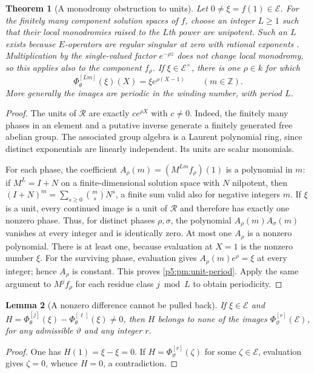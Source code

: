 \documentclass[11pt,a4paper]{article}
\newtheorem{theorem}{Theorem}[section]
\newtheorem{lemma}[theorem]{Lemma}
\theoremstyle{definition}
\theoremstyle{remark}
\numberwithin{equation}{section}
\begin{document}
\begin{theorem}[A monodromy obstruction to units]
\label{p5:pm:units}
Let $0\ne\xi=f(1)\in\mathcal E$.  For the finitely many component
solution spaces of $f$, choose an integer $L\ge1$ such that their
local monodromies raised to the $L$th power are unipotent.  Such an
$L$ exists because $E$-operators are regular singular at zero with
rational exponents
\cite[\S1, equation~(1.1)]{p5:FischlerRivoal2016Eoperators}.
Multiplication by the single-valued factor $e^{-\rho z}$ does not
change local monodromy, so this applies also to the component $f_\rho$.
If $\xi\in\mathcal E^\times$, there is one $\rho\in k$ for which
\begin{equation}\label{p5:pm:unit-period}
 \Phi_\theta^{[Lm]}(\xi)(X)=\xi e^{\rho(X-1)}
 \qquad(m\in\mathbb Z).
\end{equation}
More generally the images are periodic in the winding number,
with period $L$.
\end{theorem}
\begin{proof}
The units of $\mathcal R$ are exactly $c e^{\rho X}$ with
$c\ne0$.  Indeed, the finitely many phases in an element and a
putative inverse generate a finitely generated free abelian group.
The associated group algebra is a Laurent polynomial ring, since
distinct exponentials are linearly independent.  Its units are
scalar monomials.

For each phase, the coefficient
$A_\rho(m)=(M^{Lm}f_\rho)(1)$ is a polynomial in $m$:
if $M^L=I+N$ on a finite-dimensional solution space with $N$
nilpotent, then
$(I+N)^m=\sum_{s\ge0}\binom ms N^s$, a finite sum valid also for
negative integers $m$.  If $\xi$ is a unit, every continued image
is a unit of $\mathcal R$ and therefore has exactly one nonzero
phase.  Thus, for distinct phases $\rho,\sigma$, the polynomial
$A_\rho(m)A_\sigma(m)$ vanishes at every integer and is identically
zero.  At most one $A_\rho$ is a nonzero polynomial.  There is at
least one, because evaluation at $X=1$ is the nonzero number $\xi$.
For the surviving phase, evaluation gives
$A_\rho(m)e^\rho=\xi$ at every integer; hence $A_\rho$ is constant.
This proves \eqref{p5:pm:unit-period}.  Apply the same argument to
$M^j f_\rho$ for each residue class $j\bmod L$ to obtain periodicity.
\end{proof}

\begin{lemma}[A nonzero difference cannot be pulled back]
\label{p5:pm:no-common-image}
If $\xi\in\mathcal E$ and
$H=\Phi_\theta^{[j]}(\xi)-\Phi_\theta^{[\ell]}(\xi)\ne0$,
then $H$ belongs to none of the images
$\Phi_\vartheta^{[r]}(\mathcal E)$, for any admissible
$\vartheta$ and any integer $r$.
\end{lemma}
\begin{proof}
One has $H(1)=\xi-\xi=0$.  If
$H=\Phi_\vartheta^{[r]}(\zeta)$ for some $\zeta\in\mathcal E$,
evaluation gives $\zeta=0$, whence $H=0$, a contradiction.
\end{proof}
\end{document}
